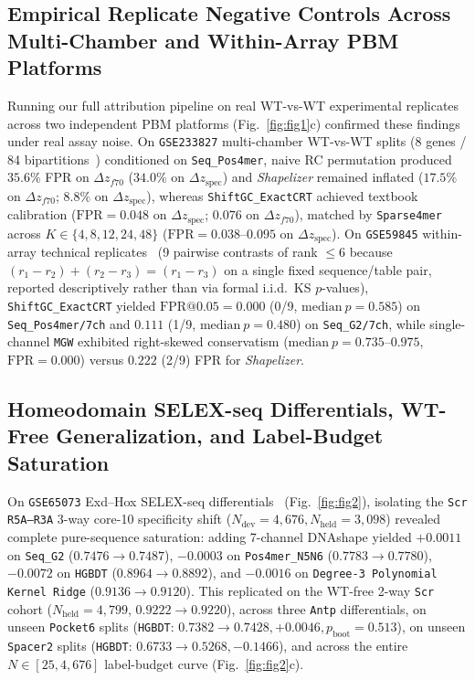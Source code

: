 \documentclass[11pt,a4paper]{article}
\begin{document}
\subsection{Empirical Replicate Negative Controls Across Multi-Chamber and Within-Array PBM Platforms}
Running our full attribution pipeline on real WT-vs-WT experimental replicates across two independent PBM platforms (Fig.~\ref{fig:fig1}c) confirmed these findings under real assay noise. On \texttt{GSE233827} multi-chamber WT-vs-WT splits (8 genes / 84 bipartitions~\cite{kock2024natcomm}) conditioned on \texttt{Seq\_Pos4mer}, naive RC permutation produced $35.6\%$ FPR on $\Delta z_{f70}$ ($34.0\%$ on $\Delta z_{\mathrm{spec}}$) and \emph{Shapelizer} remained inflated ($17.5\%$ on $\Delta z_{f70}$; $8.8\%$ on $\Delta z_{\mathrm{spec}}$), whereas \texttt{ShiftGC\_ExactCRT} achieved textbook calibration ($\mathrm{FPR} = 0.048$ on $\Delta z_{\mathrm{spec}}$; $0.076$ on $\Delta z_{f70}$), matched by \texttt{Sparse4mer} across $K \in \{4, 8, 12, 24, 48\}$ ($\mathrm{FPR} = 0.038\text{--}0.095$ on $\Delta z_{\mathrm{spec}}$). On \texttt{GSE59845} within-array technical replicates~\cite{gordan2013cellrep} (9 pairwise contrasts of rank $\le 6$ because $(r_1-r_2)+(r_2-r_3)=(r_1-r_3)$ on a single fixed sequence/table pair, reported descriptively rather than via formal i.i.d.\ KS $p$-values), \texttt{ShiftGC\_ExactCRT} yielded $\mathrm{FPR@0.05} = 0.000$ (0/9, $\mathrm{median}\ p = 0.585$) on \texttt{Seq\_Pos4mer/7ch} and $0.111$ (1/9, $\mathrm{median}\ p = 0.480$) on \texttt{Seq\_G2/7ch}, while single-channel \texttt{MGW} exhibited right-skewed conservatism ($\mathrm{median}\ p = 0.735\text{--}0.975$, $\mathrm{FPR} = 0.000$) versus $0.222$ (2/9) FPR for \emph{Shapelizer}.

\subsection{Homeodomain SELEX-seq Differentials, WT-Free Generalization, and Label-Budget Saturation}
On \texttt{GSE65073} Exd--Hox SELEX-seq differentials~\cite{slattery2011cell,abe2015cell} (Fig.~\ref{fig:fig2}), isolating the \texttt{Scr R5A--R3A} 3-way core-10 specificity shift ($N_{\mathrm{dev}} = 4{,}676, N_{\mathrm{held}} = 3{,}098$) revealed complete pure-sequence saturation: adding 7-channel DNAshape yielded $+0.0011$ on \texttt{Seq\_G2} ($0.7476 \to 0.7487$), $-0.0003$ on \texttt{Pos4mer\_N5N6} ($0.7783 \to 0.7780$), $-0.0072$ on \texttt{HGBDT} ($0.8964 \to 0.8892$), and $-0.0016$ on \texttt{Degree-3 Polynomial Kernel Ridge} ($0.9136 \to 0.9120$). This replicated on the WT-free 2-way \texttt{Scr} cohort ($N_{\mathrm{held}} = 4{,}799$, $0.9222 \to 0.9220$), across three \texttt{Antp} differentials, on unseen \texttt{Pocket6} splits (\texttt{HGBDT}: $0.7382 \to 0.7428, +0.0046, p_{\mathrm{boot}} = 0.513$), on unseen \texttt{Spacer2} splits (\texttt{HGBDT}: $0.6733 \to 0.5268, -0.1466$), and across the entire $N \in [25, 4{,}676]$ label-budget curve (Fig.~\ref{fig:fig2}c).
\end{document}

